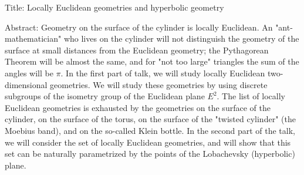 

Title: 
    Locally Euclidean geometries and hyperbolic geometry

Abstract: 
      Geometry on the surface of the cylinder is 
locally Euclidean. An "ant-mathematician" who lives 
on the cylinder will not distinguish the geometry 
of the surface at small distances from the Euclidean  
geometry; the Pythagorean Theorem will be almost the 
same, and for "not too large" triangles the sum of 
the angles will  be $\pi$.
     In the first part of talk, we will study locally 
Euclidean two-dimensional geometries. We will study  
these geometries by using discrete subgroups of the 
isometry group of the Euclidean plane $E^2$. 
The list of locally Euclidean geometries  is exhausted 
by the geometries  on the surface of the cylinder, 
on the surface of the torus, on the surface of the 
"twisted cylinder" (the Moebius band), and on the 
so-called Klein bottle.
     In the second part of the talk, we will consider 
the set of locally Euclidean  geometries, and will 
show that this set can be naturally parametrized by 
the points of the Lobachevsky (hyperbolic) plane.


